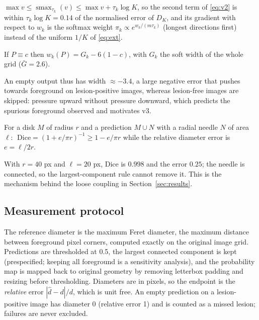 \documentclass{midl}
\DeclareMathOperator{\smax}{smax}
\begin{document}
\begin{proposition}\label{prop:smax}
$\max v\le\smax_{\tau_k}(v)\le\max v+\tau_k\log K$, so the second term of \eqref{eq:v2} is within $\tau_k\log K=0.14$ of the normalised error of $D_K$, and its gradient with respect to $w_k$ is the softmax weight $\pi_k\propto e^{w_k/(m\tau_k)}$ (longest directions first) instead of the uniform $1/K$ of \eqref{eq:ext}.
\end{proposition}

\begin{proposition}\label{prop:uniform}
If $P\equiv c$ then $w_k(P)=G_k-6(1-c)$, with $G_k$ the soft width of the whole grid ($\bar G=2.6$).
\end{proposition}
An empty output thus has width $\approx-3.4$, a large negative error that pushes towards foreground on lesion-positive images, whereas lesion-free images are skipped: pressure upward without pressure downward, which predicts the spurious foreground observed and motivates v3.

\begin{proposition}\label{prop:dice}
For a disk $M$ of radius $r$ and a prediction $M\cup N$ with a radial needle $N$ of area $\ell$: $\;\mathrm{Dice}=(1+e/\pi r)^{-1}\ge1-e/\pi r$ while the relative diameter error is $e=\ell/2r$.
\end{proposition}
With $r=40$ px and $\ell=20$ px, Dice is $0.998$ and the error $0.25$; the needle is connected, so the largest-component rule cannot remove it. This is the mechanism behind the loose coupling in Section~\ref{sec:results}.

\subsection{Measurement protocol}
The reference diameter is the maximum Feret diameter, the maximum distance between foreground pixel corners, computed exactly on the original image grid. Predictions are thresholded at 0.5, the largest connected component is kept (prespecified; keeping all foreground is a sensitivity analysis), and the probability map is mapped back to original geometry by removing letterbox padding and resizing before thresholding. Diameters are in pixels, so the endpoint is the \emph{relative} error $|\hat d-d|/d$, which is unit free. An empty prediction on a lesion-positive image has diameter 0 (relative error 1) and is counted as a missed lesion; failures are never excluded.
\end{document}
